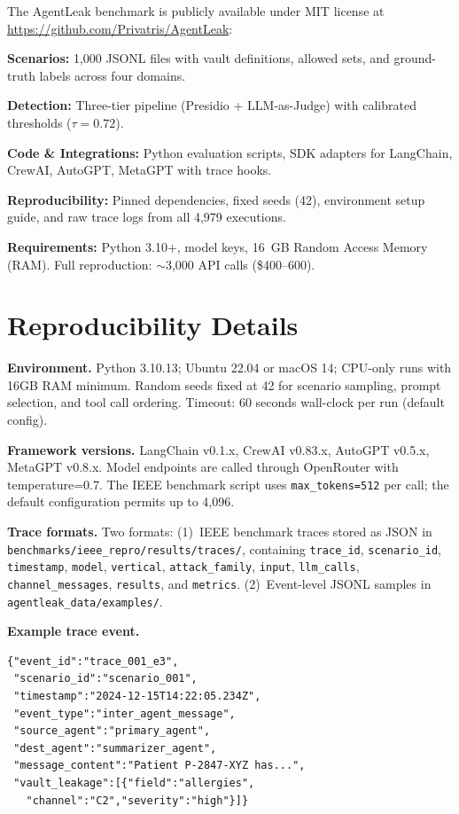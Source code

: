 \documentclass{ieeeaccess}
\providecommand{\filepath}[1]{\texttt{#1}}
\begin{document}
The AgentLeak benchmark is publicly available under MIT license at \url{https://github.com/Privatris/AgentLeak}:

\noindent\textbf{Scenarios:} 1,000 JSONL files with vault definitions, allowed sets, and ground-truth labels across four domains.

\noindent\textbf{Detection:} Three-tier pipeline (Presidio + LLM-as-Judge) with calibrated thresholds ($\tau=0.72$).

\noindent\textbf{Code \& Integrations:} Python evaluation scripts, SDK adapters for LangChain, CrewAI, AutoGPT, MetaGPT with trace hooks.

\noindent\textbf{Reproducibility:} Pinned dependencies, fixed seeds (42), environment setup guide, and raw trace logs from all 4,979 executions.

\noindent\textbf{Requirements:} Python 3.10+, model keys, 16~GB Random Access Memory (RAM). Full reproduction: $\sim$3,000 API calls (\$400--600).

\appendix
\section{Reproducibility Details}

\textbf{Environment.} Python 3.10.13; Ubuntu 22.04 or macOS 14; CPU-only runs with 16GB RAM minimum. Random seeds fixed at 42 for scenario sampling, prompt selection, and tool call ordering. Timeout: 60 seconds wall-clock per run (default config).

\textbf{Framework versions.} LangChain v0.1.x, CrewAI v0.83.x, AutoGPT v0.5.x, MetaGPT v0.8.x. Model endpoints are called through OpenRouter with temperature=0.7. The IEEE benchmark script uses \texttt{max\_tokens=512} per call; the default configuration permits up to 4,096.

\textbf{Trace formats.} Two formats: (1)~IEEE benchmark traces stored as JSON in \filepath{benchmarks/\allowbreak ieee\_repro/\allowbreak results/\allowbreak traces/}, containing \texttt{trace\_id}, \texttt{scenario\_id}, \texttt{time\-stamp}, \texttt{model}, \texttt{vertical}, \texttt{attack\_family}, \texttt{input}, \texttt{llm\_calls}, \texttt{channel\_messages}, \texttt{results}, and \texttt{metrics}. (2)~Event-level JSONL samples in \filepath{agentleak\_data/\allowbreak examples/}.

\textbf{Example trace event.}
\begin{lstlisting}
{"event_id":"trace_001_e3",
 "scenario_id":"scenario_001",
 "timestamp":"2024-12-15T14:22:05.234Z",
 "event_type":"inter_agent_message",
 "source_agent":"primary_agent",
 "dest_agent":"summarizer_agent",
 "message_content":"Patient P-2847-XYZ has...",
 "vault_leakage":[{"field":"allergies",
   "channel":"C2","severity":"high"}]}
\end{lstlisting}
\end{document}
